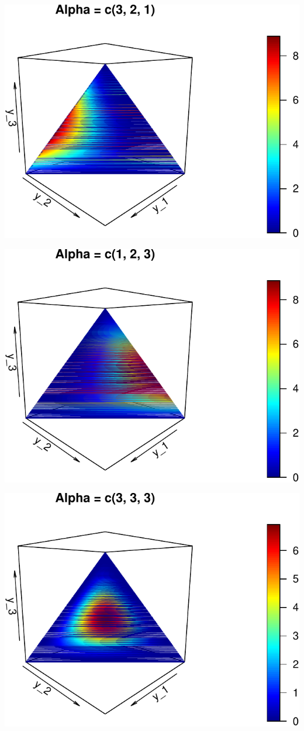 \documentclass[]{book}
\begin{document}
\begin{center}\includegraphics[width=0.8\linewidth]{notas_livro_files/figure-latex/graf15-2} \end{center}

\begin{center}\includegraphics[width=0.8\linewidth]{notas_livro_files/figure-latex/graf15-3} \end{center}

\begin{center}\includegraphics[width=0.8\linewidth]{notas_livro_files/figure-latex/graf15-4} \end{center}
\end{document}
